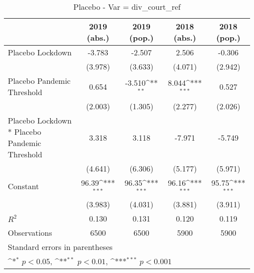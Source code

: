\documentclass{article}
\begin{document}
{
\def\sym#1{\ifmmode^{#1}\else\(^{#1}\)\fi}
\begin{longtable}{l*{4}{c}}
\caption{Placebo - Var = div\_court\_ref}\\
\hline\hline\endfirsthead\hline\endhead\hline\endfoot\endlastfoot
                &\multicolumn{1}{c}{2019 (abs.)}&\multicolumn{1}{c}{2019 (pop.)}&\multicolumn{1}{c}{2018 (abs.)}&\multicolumn{1}{c}{2018 (pop.)}\\
\hline
Placebo Lockdown&   -3.783         &   -2.507         &    2.506         &   -0.306         \\
                &  (3.978)         &  (3.633)         &  (4.071)         &  (2.942)         \\
Placebo Pandemic Threshold&    0.654         &   -3.510\sym{**} &    8.044\sym{***}&    0.527         \\
                &  (2.003)         &  (1.305)         &  (2.277)         &  (2.026)         \\
Placebo Lockdown * Placebo Pandemic Threshold&    3.318         &    3.118         &   -7.971         &   -5.749         \\
                &  (4.641)         &  (6.306)         &  (5.177)         &  (5.971)         \\
Constant        &    96.39\sym{***}&    96.35\sym{***}&    96.16\sym{***}&    95.75\sym{***}\\
                &  (3.983)         &  (4.031)         &  (3.881)         &  (3.911)         \\
\hline
\(R^{2}\)       &    0.130         &    0.131         &    0.120         &    0.119         \\
Observations    &     6500         &     6500         &     5900         &     5900         \\
\hline\hline
\multicolumn{5}{l}{\footnotesize Standard errors in parentheses}\\
\multicolumn{5}{l}{\footnotesize \sym{*} \(p<0.05\), \sym{**} \(p<0.01\), \sym{***} \(p<0.001\)}\\
\end{longtable}
}
\end{document}
